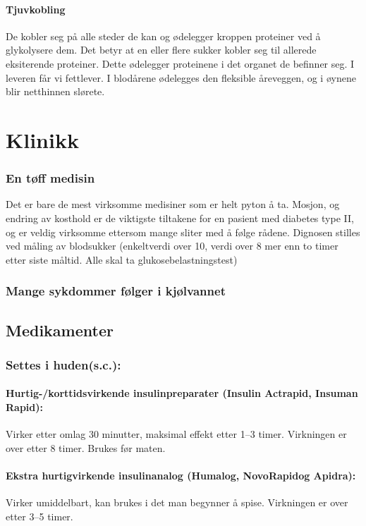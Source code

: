 			\paragraph{Tjuvkobling\\}
				De kobler seg på alle steder de kan og ødelegger kroppen proteiner ved å glykolysere dem. Det betyr at en eller flere sukker kobler seg til allerede eksiterende proteiner. Dette ødelegger proteinene i det organet de befinner seg. I leveren får vi fettlever. I blodårene ødelegges den fleksible åreveggen, og i øynene blir netthinnen slørete.
		\section{Klinikk}
			\subsubsection{En tøff medisin}
				Det er bare de mest virksomme medisiner som er helt pyton å ta. Mosjon, og endring av kosthold er de viktigste tiltakene for en pasient med diabetes type II, og er veldig virksomme ettersom mange sliter med å følge rådene. Dignosen stilles ved måling av blodsukker (enkeltverdi over 10, verdi over 8 mer enn to timer etter siste måltid. Alle skal ta glukosebelastningstest)
			\subsubsection{Mange sykdommer følger i kjølvannet}
		\subsection{Medikamenter\cite{legevakthandboka}}
				\subsubsection{Settes i huden(s.c.):}
					\paragraph{Hurtig-/korttidsvirkende insulinpreparater (Insulin Actrapid\textregistered, Insuman Rapid\textregistered):\\}Virker etter omlag 30 minutter, maksimal effekt etter 1–3 timer. Virkningen er over etter 8 timer. Brukes før maten.

					\paragraph{Ekstra hurtigvirkende insulinanalog (Humalog\textregistered, NovoRapid\textregistered og Apidra\textregistered):}Virker  umiddelbart, kan brukes i det man begynner å spise. Virkningen er over etter 3–5 timer.

